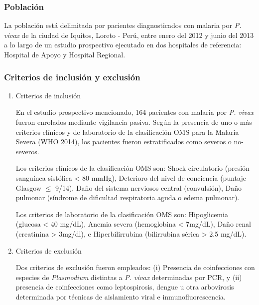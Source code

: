 \documentclass[a4paper]{article}
\begin{document}
\subsubsection{Población}\label{poblacion}

La población está delimitada por pacientes diagnosticados con malaria
por \emph{P. vivax} de la ciudad de Iquitos, Loreto - Perú, entre enero
del 2012 y junio del 2013 a lo largo de un estudio prospectivo ejecutado
en dos hospitales de referencia: Hospital de Apoyo y Hospital Regional.

\subsubsection{Criterios de inclusión y
exclusión}\label{criterios-de-inclusion-y-exclusion}

\begin{enumerate}
\def\labelenumi{\alph{enumi}.}
\item
  Criterios de inclusión

  En el estudio prospectivo mencionado, 164 pacientes con malaria por
  \emph{P. vivax} fueron enrolados mediante vigilancia pasiva. Según la
  presencia de uno o más criterios clínicos y de laboratorio de la
  clasificación OMS para la Malaria Severa (WHO
  \protect\hyperlink{ref-WHO2014severe}{2014}), los pacientes fueron
  estratificados como severos o no-severos.

  Los criterios clínicos de la clasificación OMS son: Shock circulatorio
  (presión sanguínea sistólica \textless{} 80 mmHg), Deterioro del nivel
  de conciencia (puntaje Glasgow \(\le\) 9/14), Daño del sistema
  nerviosos central (convulsión), Daño pulmonar (síndrome de dificultad
  respiratoria aguda o edema pulmonar).

  Los criterios de laboratorio de la clasificación OMS son: Hipoglicemia
  (glucosa \textless{} 40 mg/dL), Anemia severa (hemoglobina \textless{}
  7mg/dL), Daño renal (creatinina \textgreater{} 3mg/dl), e
  Hiperbilirrubina (bilirrubina sérica \textgreater{} 2.5 mg/dL). 
\item
  Criterios de exclusión

  Dos criterios de exclusión fueron empleados: (i) Presencia de
  coinfecciones con especies de \emph{Plasmodium} distintas a \emph{P.
  vivax} determinadas por PCR, y (ii) presencia de coinfecciones como
  leptospirosis, dengue u otra arbovirosis determinada por técnicas de
  aislamiento viral e inmunofluorescencia. 
\end{enumerate}
\end{document}
